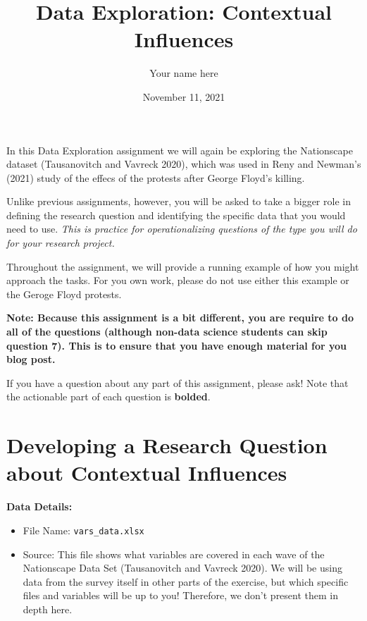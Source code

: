 \documentclass[
]{article}
\title{Data Exploration: Contextual Influences}
\author{Your name here}
\date{November 11, 2021}
\begin{document}
\maketitle

In this Data Exploration assignment we will again be exploring the
Nationscape dataset (Tausanovitch and Vavreck 2020), which was used in
Reny and Newman's (2021) study of the effecs of the protests after
George Floyd's killing.

Unlike previous assignments, however, you will be asked to take a bigger
role in defining the research question and identifying the specific data
that you would need to use. \emph{This is practice for operationalizing
questions of the type you will do for your research project.}

Throughout the assignment, we will provide a running example of how you
might approach the tasks. For you own work, please do not use either
this example or the Geroge Floyd protests.

\textbf{Note: Because this assignment is a bit different, you are
require to do all of the questions (although non-data science students
can skip question 7). This is to ensure that you have enough material
for you blog post.}

If you have a question about any part of this assignment, please ask!
Note that the actionable part of each question is \textbf{bolded}.

\hypertarget{developing-a-research-question-about-contextual-influences}{%
\section{Developing a Research Question about Contextual
Influences}\label{developing-a-research-question-about-contextual-influences}}

\textbf{Data Details:}

\begin{itemize}
\item
  File Name: \texttt{vars\_data.xlsx}
\item
  Source: This file shows what variables are covered in each wave of the
  Nationscape Data Set (Tausanovitch and Vavreck 2020). We will be using
  data from the survey itself in other parts of the exercise, but which
  specific files and variables will be up to you! Therefore, we don't
  present them in depth here.
\end{itemize}
\end{document}
